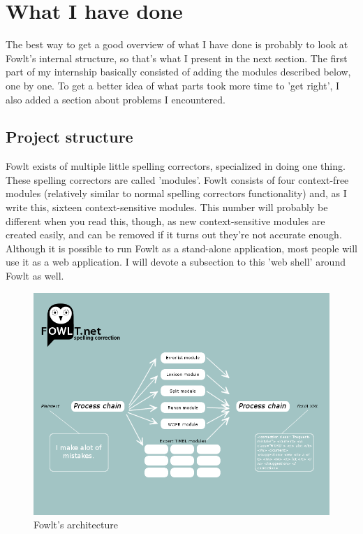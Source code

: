 \documentclass[12pt]{article}
\let\stdsection\section
\renewcommand\section{\newpage\stdsection}
\begin{document}
\section{What I have done}
The best way to get a good overview of what I have done is probably to look at Fowlt's internal structure, so that's what I present in the next section. The first part of my internship basically consisted of adding the modules described below, one by one. To get a better idea of what parts took more time to 'get right', I also added a section about problems I encountered.

\subsection{Project structure}
Fowlt exists of multiple little spelling correctors, specialized in doing one thing. These spelling correctors are called 'modules'. Fowlt consists of four context-free modules (relatively similar to normal spelling correctors functionality) and, as I write this, sixteen context-sensitive modules. This number will probably be different when you read this, though, as new context-sensitive modules are created easily, and can be removed if it turns out they're not accurate enough. Although it is possible to run Fowlt as a stand-alone application, most people will use it as a web application. I will devote a subsection to this 'web shell' around Fowlt as well.

\begin{figure}[H]
\centering
\includegraphics[width=1\textwidth]{fowlt_chain.png}
\caption{Fowlt's architecture}
\label{fig:chain}
\end{figure}
\end{document}
